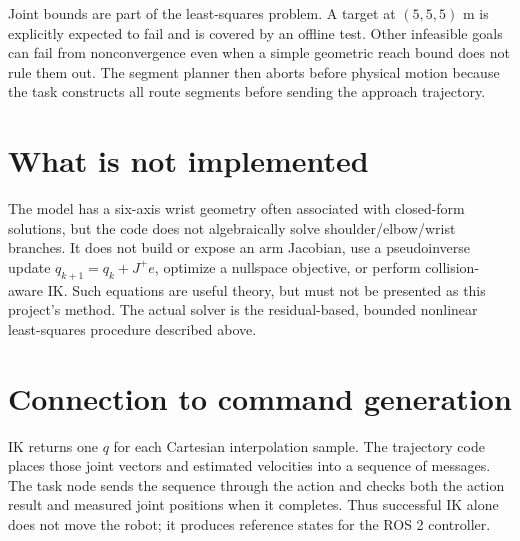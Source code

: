 Joint bounds are part of the least-squares problem. A target at $(5,5,5)$ m is
explicitly expected to fail and is covered by an offline test. Other
infeasible goals can fail from nonconvergence even when a simple geometric
reach bound does not rule them out. The segment planner then aborts before
physical motion because the task constructs all route segments before sending
the approach trajectory.

\section{What is not implemented}
The model has a six-axis wrist geometry often associated with closed-form
solutions, but the code does not algebraically solve shoulder/elbow/wrist
branches. It does not build or expose an arm Jacobian, use a pseudoinverse
update $q_{k+1}=q_k+J^+e$, optimize a nullspace objective, or perform
collision-aware IK. Such equations are useful theory, but must not be
presented as this project's method. The actual solver is the residual-based,
bounded nonlinear least-squares procedure described above.

\section{Connection to command generation}
IK returns one $q$ for each Cartesian interpolation sample. The trajectory
code places those joint vectors and estimated velocities into a sequence of
 messages. The task node sends the sequence through
the  action and checks both the action result and
measured joint positions when it completes. Thus successful IK alone does not
move the robot; it produces reference states for the ROS 2 controller.
